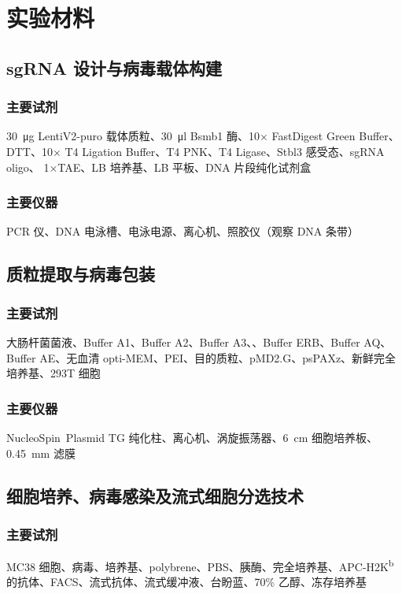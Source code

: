 \section{实验材料}
\subsection{sgRNA 设计与病毒载体构建}
\subsubsection{主要试剂}
\qty{30}{\ug} LentiV2-puro 载体质粒、\qty{30}{\ul} Bsmb1 酶、10\(\times\) FastDigest Green Buffer、DTT、10\(\times\) T4 Ligation Buffer、T4 PNK、T4 Ligase、Stbl3 感受态、sgRNA oligo、 1\(\times\)TAE、LB 培养基、LB 平板、DNA 片段纯化试剂盒

\subsubsection{主要仪器}
PCR 仪、DNA 电泳槽、电泳电源、离心机、照胶仪（观察 DNA 条带）

\subsection{质粒提取与病毒包装}
\subsubsection{主要试剂}
大肠杆菌菌液、Buffer A1、Buffer A2、Buffer A3、、Buffer ERB、Buffer AQ、Buffer AE、无血清 opti-MEM、PEI、目的质粒、pMD2.G、psPAXz、新鲜完全培养基、293T 细胞

\subsubsection{主要仪器}
NucleoSpin\textregistered\ Plasmid TG 纯化柱、离心机、涡旋振荡器、\qty{6}{\cm} 细胞培养板、\qty{0.45}{\mm} 滤膜

\subsection{细胞培养、病毒感染及流式细胞分选技术}
\subsubsection{主要试剂}
MC38 细胞、病毒、培养基、polybrene、PBS、胰酶、完全培养基、APC-H2K\textsuperscript{b} 的抗体、FACS、流式抗体、流式缓冲液、台盼蓝、70\% 乙醇、冻存培养基


